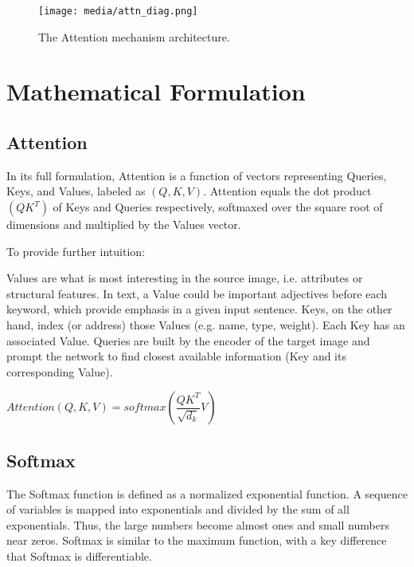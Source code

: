 \begin{figure}[H]
	\begin{center}
	\texttt{[image: media/attn\_diag.png]}
	\end{center}
	\caption[Attention Mechanism]{The Attention mechanism architecture. \citep{GoogleViT}}
	\end{figure}


\section{Mathematical Formulation}

\subsection{Attention}

In its full formulation, Attention is a function of vectors representing Queries, Keys, and Values, 
labeled as $(Q,K,V)$. 
Attention equals the dot product $(QK^T)$ of Keys and Queries respectively, softmaxed over 
the square root of dimensions and multiplied by the Values vector.

To provide further intuition:

Values are what is most interesting in the source image, i.e. 
attributes or structural features. In text, a Value could be important adjectives before each keyword, 
which provide emphasis in a given input sentence.
Keys, on the other hand, index (or address) those Values (e.g. name, type, weight). 
Each Key has an associated Value. 
Queries are built by the encoder of the target image and prompt the network to find closest 
available information (Key and its corresponding Value). 

\begin{center}
	$ Attention(Q, K, V) = softmax(\dfrac{QK^T}{\sqrt{d_k}} V ) $
	\end{center}




\subsection{Softmax}

The Softmax function is defined as a normalized exponential function. 
A sequence of variables is mapped into exponentials and divided by the sum of all exponentials. 
Thus, the large numbers become almost ones and small numbers near zeros. Softmax is similar to the maximum 
function, with a key difference that Softmax is differentiable. 

